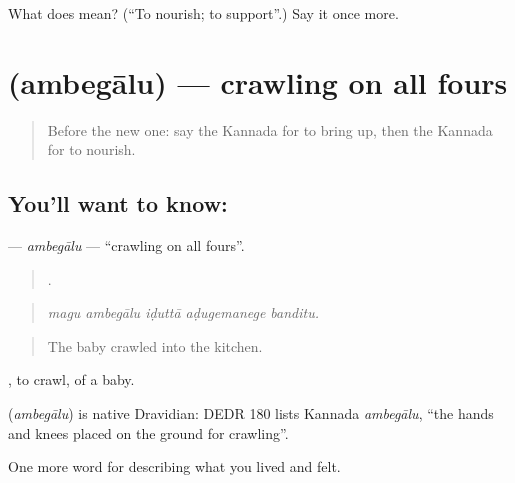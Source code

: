 \begin{tcolorbox}[breakable,colback=teal!4,colframe=teal!35!black,title={Before you move on}]
What does  mean? (\textquotedblleft{}To nourish; to support\textquotedblright{}.) Say it once more.
\end{tcolorbox}
\section[\texorpdfstring{\kn{ಅಂಬೆಗಾಲು} (ambegālu)}{ಅಂಬೆಗಾಲು (ambegālu)}]{ (ambegālu) — crawling on all fours}

\label{lesson:KA-C527-ambegalu}



\begin{quote}
Before the new one: say the Kannada for to bring up, then the Kannada for to nourish.
\end{quote}

\subsection*{You'll want to know: }
\textbf{} — \emph{ambegālu} — \textquotedblleft{}crawling on all fours\textquotedblright{}.

\begin{quote}
    .
\end{quote}

\begin{quote}
\emph{magu ambegālu iḍuttā aḍugemanege banditu.}
\end{quote}

\begin{quote}
The baby crawled into the kitchen.
\end{quote}

 , to crawl, of a baby.

\begin{cousinweb}
\textbf{} (\emph{ambegālu}) is native Dravidian: DEDR 180 lists Kannada \emph{ambegālu}, \textquotedblleft{}the hands and knees placed on the ground for crawling\textquotedblright{}.
\end{cousinweb}

\begin{grammarlens}[title={What you've built}]
One more word for describing what you lived and felt.
\end{grammarlens}

